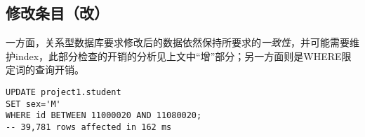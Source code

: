\subsection{修改条目（改）}
一方面，关系型数据库要求修改后的数据依然保持所要求的\emph{一致性}，并可能需要维护index，此部分检查的开销的分析见上文中“增”部分；另一方面则是WHERE限定词的查询开销。
\begin{lstlisting}
UPDATE project1.student
SET sex='M'
WHERE id BETWEEN 11000020 AND 11080020;
-- 39,781 rows affected in 162 ms
\end{lstlisting}
\vspace{-2em}